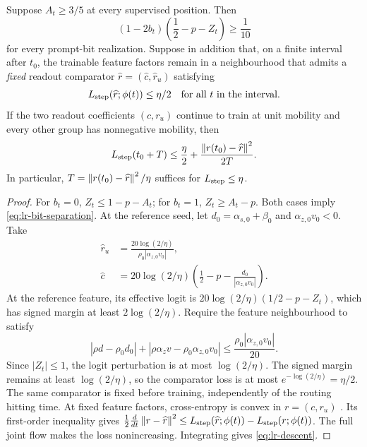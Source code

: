 \begin{lrlemma}
\label{lem:lr-readout-convergence}
Suppose $A_t\ge3/5$ at every supervised position.  Then
\begin{equation}\label{eq:lr-bit-separation}
 (1-2b_t)\left(\frac12-p-Z_t\right)\ge\frac1{10}
\end{equation}
for every prompt-bit realization.  Suppose in addition that, on a
finite interval after $t_0$, the trainable feature factors remain in a
neighbourhood that admits a \emph{fixed} readout comparator
$\widehat r=(\widehat c,\widehat r_u)$ satisfying
\begin{equation}\label{eq:lr-comparator}
 L_{\mathrm{step}}(\widehat r;\phi(t))\le\eta/2
 \quad\text{for all }t\text{ in the interval}.
\end{equation}
If the two readout coefficients $(c,r_u)$ continue to train at unit
mobility and every other group has nonnegative mobility, then
\begin{equation}\label{eq:lr-descent}
 L_{\mathrm{step}}(t_0+T)\le\frac\eta2+
 \frac{\left\lVert r(t_0)-\widehat r\right\rVert^2}{2T}.
\end{equation}
In particular, $T=\left\lVert r(t_0)-\widehat r\right\rVert^2/\eta$ suffices for
$L_{\mathrm{step}}\le\eta$.
\end{lrlemma}
\begin{proof}
For $b_t=0$, $Z_t\le1-p-A_t$; for $b_t=1$,
$Z_t\ge A_t-p$.  Both cases imply
\eqref{eq:lr-bit-separation}.
At the reference seed, let $d_0=\alpha_{s,0}+\beta_0$ and $\alpha_{z,0}v_0<0$. Take
\[
 \begin{aligned}
 \widehat r_u&=\frac{20\log(2/\eta)}{\rho_0|\alpha_{z,0}v_0|},\\
 \widehat c&=20\log(2/\eta)\left(\frac12-p-\frac{d_0}{|\alpha_{z,0}v_0|}\right).
 \end{aligned}
\] 
At the reference feature, its effective logit is
$20\log(2/\eta)(1/2-p-Z_t)$, which has signed margin at least $2\log(2/\eta)$.
Require the feature neighbourhood to satisfy
\begin{equation}\label{eq:lr-comparator-stability}
 |\rho d-\rho_0d_0|+|\rho {\alpha_z v}-\rho_0{\alpha_{z,0}v_0}|
 \le\frac{\rho_0|{\alpha_{z,0}v_0}|}{20}.
\end{equation}
Since $|Z_t|\le1$, the logit perturbation is at most $\log(2/\eta)$.
The signed margin remains at least $\log(2/\eta)$, so the comparator loss is
at most $e^{-\log(2/\eta)}=\eta/2$. The same comparator is fixed before training,
independently of the routing hitting time.
At fixed feature factors, cross-entropy is convex in $r=(c,r_u)$ \citep[Section~3.1.5]{boyd2004convex}. Its first-order inequality \citep[Section~3.1.3]{boyd2004convex} gives
$\frac12\frac{d}{dt}\left\lVert r-\widehat r\right\rVert^2
\le L_{\mathrm{step}}(\widehat r;\phi(t))-L_{\mathrm{step}}(r;\phi(t))$.
The full joint flow makes the loss nonincreasing.  Integrating gives
\eqref{eq:lr-descent}.
\end{proof}

